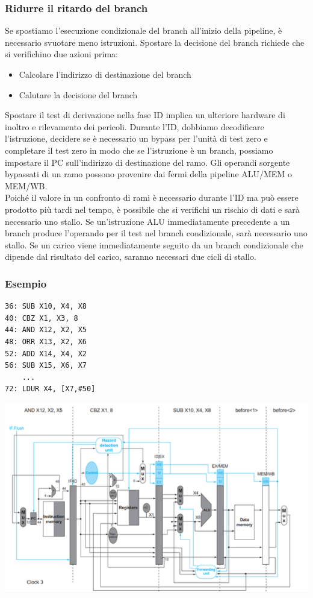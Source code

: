\documentclass[12pt,a4paper]{article}
\begin{document}
\subsubsection{Ridurre il ritardo del branch}
Se spostiamo l'esecuzione condizionale del branch all'inizio della pipeline, è necessario svuotare meno istruzioni. Spostare la decisione del branch richiede che si verifichino due azioni prima:
\begin{itemize}
\item Calcolare l'indirizzo di destinazione del branch
\item Calutare la decisione del branch
\end{itemize}
Spostare il test di derivazione nella fase ID implica un ulteriore hardware di inoltro e rilevamento dei pericoli. Durante l'ID, dobbiamo decodificare l'istruzione, decidere se è necessario un bypass per l'unità di test zero e completare il test zero in modo che se l'istruzione è un branch, possiamo impostare il PC sull'indirizzo di destinazione del ramo. Gli operandi sorgente bypassati di un ramo possono provenire dai fermi della pipeline ALU/MEM o MEM/WB.\\
Poiché il valore in un confronto di rami è necessario durante l'ID ma può essere prodotto più tardi nel tempo, è possibile che si verifichi un rischio di dati e sarà necessario uno stallo. Se un'istruzione ALU immediatamente precedente a un branch produce l'operando per il test nel branch condizionale, sarà necessario uno stallo. Se un carico viene immediatamente seguito da un branch condizionale che dipende dal risultato del carico, saranno necessari due cicli di stallo.

\subsubsection{Esempio}
\begin{verbatim}
36: SUB X10, X4, X8 
40: CBZ X1, X3, 8 
44: AND X12, X2, X5 
48: ORR X13, X2, X6 
52: ADD X14, X4, X2 
56: SUB X15, X6, X7
    ...
72: LDUR X4, [X7,#50]
\end{verbatim}
\begin{center}
\includegraphics[width=0.6\columnwidth]{img/branch_taken.png}
\end{center}
\end{document}
